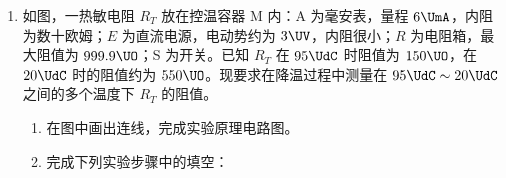 \documentclass[\gkver]{gaokaozhenti}
\begin{document}
\begin{enumerate}

\begin{enumerate}
	\item
	为了测试重物下落的加速度，还需要的实验器材有。（填入正确选项前的字母）

	（A）天平　　（B）秒表　　（C）米尺
	\item
	若实验中所得到的重物下落的加速度值小于当地的重物加速度值，而实验操作与数据处理均无错误，写出一个你认为可能引起此错误差的原因：。
\end{enumerate}

\item
如图，一热敏电阻 $R_{T}$ 放在控温容器 M 内：A 为毫安表，量程 $6\UmA$，内阻为数十欧姆；$E$ 为直流电源，电动势约为 $3\UV$，内阻很小；$R$ 为电阻箱，最大阻值为 $999.9\UO$；S 为开关。已知 $R_{T}$ 在 $95\UdC$ 时阻值为 $150\UO$，在 $20\UdC$ 时的阻值约为 $550\UO$。现要求在降温过程中测量在 $95\UdC\sim20\UdC$ 之间的多个温度下 $R_{T}$ 的阻值。


\begin{enumerate}
	\item
	在图中画出连线，完成实验原理电路图。
	\item
	完成下列实验步骤中的填空：


\end{enumerate}
\end{enumerate}
\end{document}
